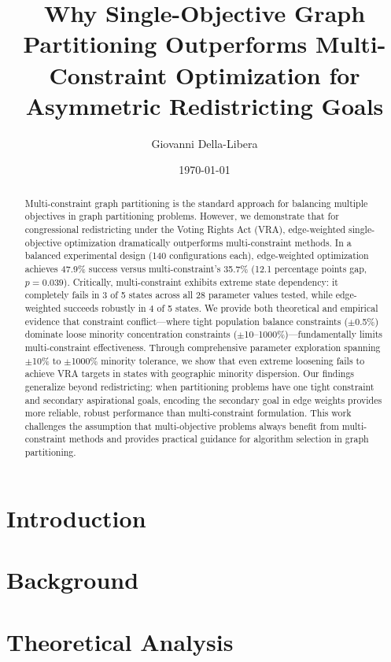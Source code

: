 \documentclass[11pt,twocolumn]{article}
\title{\textbf{Why Single-Objective Graph Partitioning Outperforms Multi-Constraint Optimization for Asymmetric Redistricting Goals}}
\author{
    Giovanni Della-Libera
}
\date{\today}
\begin{document}
\maketitle

\begin{abstract}
Multi-constraint graph partitioning is the standard approach for balancing multiple objectives in graph partitioning problems. However, we demonstrate that for congressional redistricting under the Voting Rights Act (VRA), edge-weighted single-objective optimization dramatically outperforms multi-constraint methods. In a balanced experimental design (140 configurations each), edge-weighted optimization achieves 47.9\% success versus multi-constraint's 35.7\% (12.1 percentage points gap, $p=0.039$). Critically, multi-constraint exhibits extreme state dependency: it completely fails in 3 of 5 states across all 28 parameter values tested, while edge-weighted succeeds robustly in 4 of 5 states. We provide both theoretical and empirical evidence that constraint conflict---where tight population balance constraints ($\pm$0.5\%) dominate loose minority concentration constraints ($\pm$10--1000\%)---fundamentally limits multi-constraint effectiveness. Through comprehensive parameter exploration spanning $\pm$10\% to $\pm$1000\% minority tolerance, we show that even extreme loosening fails to achieve VRA targets in states with geographic minority dispersion. Our findings generalize beyond redistricting: when partitioning problems have one tight constraint and secondary aspirational goals, encoding the secondary goal in edge weights provides more reliable, robust performance than multi-constraint formulation. This work challenges the assumption that multi-objective problems always benefit from multi-constraint methods and provides practical guidance for algorithm selection in graph partitioning.
\end{abstract}

\section{Introduction}


\section{Background}


\section{Theoretical Analysis}

\end{document}
